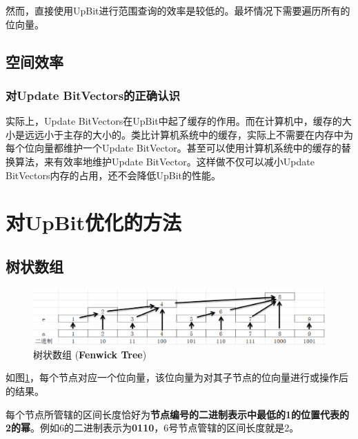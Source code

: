 \documentclass[11pt, a4paper]{article}
\begin{document}
  然而，直接使用UpBit进行范围查询的效率是较低的。最坏情况下需要遍历所有的位向量。

\subsection{空间效率}
\subsubsection{对Update BitVectors的正确认识}
实际上，Update BitVectors在UpBit中起了缓存的作用。而在计算机中，缓存的大小是远远小于主存的大小的。类比计算机系统中的缓存，实际上不需要在内存中为每个位向量都维护一个Update BitVector。甚至可以使用计算机系统中的缓存的替换算法，来有效率地维护Update BitVector。这样做不仅可以减小Update BitVectors内存的占用，还不会降低UpBit的性能。

\section{对UpBit优化的方法}
\subsection{树状数组}
\begin{figure}[H]
  \begin{center}
    \includegraphics[width=5.0in]{bit.png}
    \caption{树状数组 ({\bf Fenwick Tree})}\label{fig:bit}
  \end{center}
\end{figure}
如图\ref{fig:bit}，每个节点对应一个位向量，该位向量为对其子节点的位向量进行或操作后的结果。

每个节点所管辖的区间长度恰好为{\bf 节点编号的二进制表示中最低的1的位置代表的2的幂}。例如6的二进制表示为{\bf 0110}，6号节点管辖的区间长度就是2。
\end{document}
